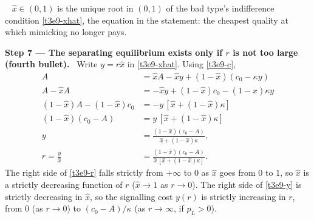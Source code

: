 \documentclass[11pt,a4paper]{article}
\newcommand{\step}[2]{\par\medskip\noindent\textbf{Step #1 --- #2.}~}
\newcommand{\answer}[1]{\par\smallskip\noindent\fbox{\textbf{Answer #1.}}~}
\begin{document}
\answer{(ii-3)} $\hat x\in(0,1)$ is the unique root in $(0,1)$ of the bad type's indifference condition \eqref{t3e9-xhat}, the equation in the statement: the cheapest quality at which mimicking no longer pays.

\step{7}{The separating equilibrium exists only if $r$ is not too large (fourth bullet)} Write $y=r\hat x$
in \eqref{t3e9-xhat}. Using \eqref{t3e9-c},
\begin{align}
  A &= \hat xA-\hat xy+(1-\hat x)(c_0-\kappa y) \nonumber\\
  A-\hat xA &= -\hat xy+(1-\hat x)c_0-(1-\hat x)\kappa y \nonumber\\
  (1-\hat x)A-(1-\hat x)c_0 &= -y\,[\hat x+(1-\hat x)\kappa] \nonumber\\
  (1-\hat x)(c_0-A) &= y\,[\hat x+(1-\hat x)\kappa] \nonumber\\
  y &= \frac{(1-\hat x)(c_0-A)}{\hat x+(1-\hat x)\kappa}, \label{t3e9-y}\\
  r = \frac{y}{\hat x} &= \frac{(1-\hat x)(c_0-A)}{\hat x\,[\hat x+(1-\hat x)\kappa]}. \label{t3e9-r}
\end{align}
The right side of \eqref{t3e9-r} falls strictly from $+\infty$ to $0$ as $\hat x$ goes from $0$ to $1$, so
$\hat x$ is a strictly decreasing function of $r$ ($\hat x\to1$ as $r\to0$). The right side of
\eqref{t3e9-y} is strictly decreasing in $\hat x$, so the signalling cost $y(r)$ is strictly increasing in
$r$, from $0$ (as $r\to0$) to $(c_0-A)/\kappa$ (as $r\to\infty$, if $p_L>0$).
\end{document}
